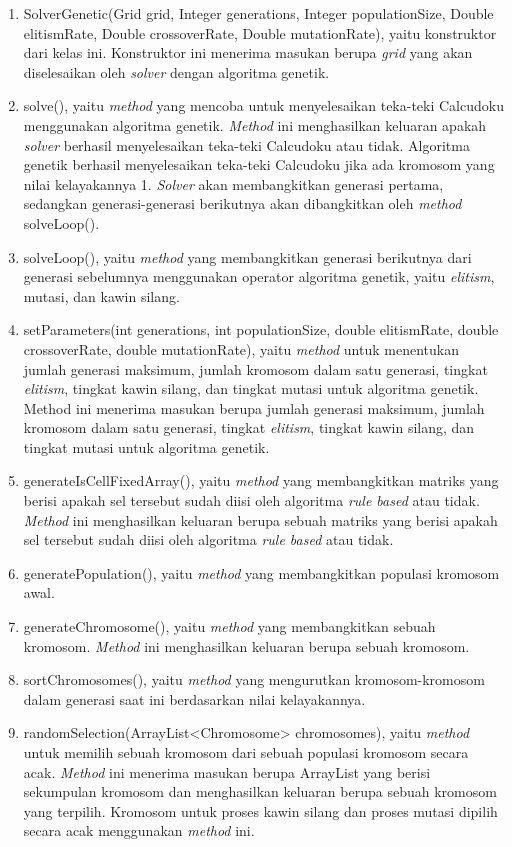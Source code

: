 \begin{enumerate}
\item SolverGenetic(Grid grid, Integer generations, Integer populationSize, Double elitismRate, Double crossoverRate, Double mutationRate), yaitu konstruktor dari kelas ini. Konstruktor ini menerima masukan berupa \textit{grid} yang akan diselesaikan oleh \textit{solver} dengan algoritma genetik.
\item solve(), yaitu \textit{method} yang mencoba untuk menyelesaikan teka-teki Calcudoku menggunakan algoritma genetik. \textit{Method} ini menghasilkan keluaran apakah \textit{solver} berhasil menyelesaikan teka-teki Calcudoku atau tidak. Algoritma genetik berhasil menyelesaikan teka-teki Calcudoku jika ada kromosom yang nilai kelayakannya 1. \textit{Solver} akan membangkitkan generasi pertama, sedangkan generasi-generasi berikutnya akan dibangkitkan oleh \textit{method} solveLoop().
\item solveLoop(), yaitu \textit{method} yang membangkitkan generasi berikutnya dari generasi sebelumnya menggunakan operator algoritma genetik, yaitu \textit{elitism}, mutasi, dan kawin silang.
\item setParameters(int generations, int populationSize, double elitismRate, double crossoverRate, double mutationRate), yaitu \textit{method} untuk menentukan jumlah generasi maksimum, jumlah kromosom dalam satu generasi, tingkat \textit{elitism}, tingkat kawin silang, dan tingkat mutasi untuk algoritma genetik. Method ini menerima masukan berupa jumlah generasi maksimum, jumlah kromosom dalam satu generasi, tingkat \textit{elitism}, tingkat kawin silang, dan tingkat mutasi untuk algoritma genetik.
\item generateIsCellFixedArray(), yaitu \textit{method} yang membangkitkan matriks yang berisi apakah sel tersebut sudah diisi oleh algoritma \textit{rule based} atau tidak. \textit{Method} ini menghasilkan keluaran berupa sebuah matriks yang berisi apakah sel tersebut sudah diisi oleh algoritma \textit{rule based} atau tidak.
\item generatePopulation(), yaitu \textit{method} yang membangkitkan populasi kromosom awal.
\item generateChromosome(), yaitu \textit{method} yang membangkitkan sebuah kromosom. \textit{Method} ini menghasilkan keluaran berupa sebuah kromosom.
\item sortChromosomes(), yaitu \textit{method} yang mengurutkan kromosom-kromosom dalam generasi saat ini berdasarkan nilai kelayakannya.
\item randomSelection(ArrayList<Chromosome> chromosomes), yaitu \textit{method} untuk memilih sebuah kromosom dari sebuah populasi kromosom secara acak. \textit{Method} ini menerima masukan berupa ArrayList yang berisi sekumpulan kromosom dan menghasilkan keluaran berupa sebuah kromosom yang terpilih. Kromosom untuk proses kawin silang dan proses mutasi dipilih secara acak menggunakan \textit{method} ini.

\end{enumerate}
